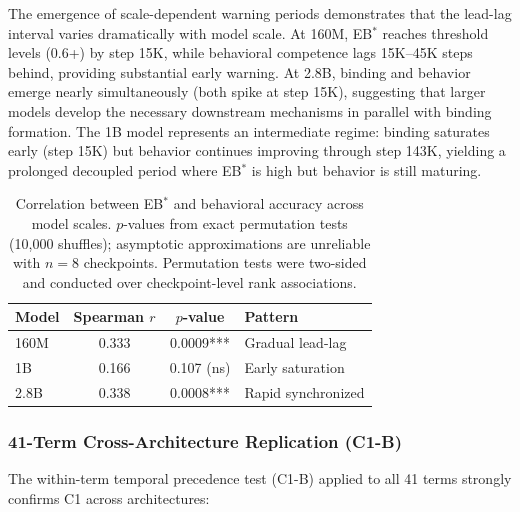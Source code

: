 \documentclass[10pt]{article} %
\begin{document}
The emergence of scale-dependent warning periods demonstrates that the lead-lag interval varies dramatically with model scale.
At 160M, EB$^*$ reaches threshold levels (0.6+) by step 15K, while behavioral competence lags 15K--45K steps behind, providing substantial early warning.
At 2.8B, binding and behavior emerge nearly simultaneously (both spike at step 15K), suggesting that larger models develop the necessary downstream mechanisms in parallel with binding formation.
The 1B model represents an intermediate regime: binding saturates early (step 15K) but behavior continues improving through step 143K, yielding a prolonged decoupled period where EB$^*$ is high but behavior is still maturing.

\begin{table}[h]
\centering
\begin{tabular}{|l|c|c|l|}
\hline
\textbf{Model} & \textbf{Spearman $r$} & \textbf{$p$-value} & \textbf{Pattern} \\
\hline
160M & 0.333 & 0.0009*** & Gradual lead-lag \\
1B & 0.166 & 0.107 (ns) & Early saturation \\
2.8B & 0.338 & 0.0008*** & Rapid synchronized \\
\hline
\end{tabular}
\caption{Correlation between EB$^*$ and behavioral accuracy across model scales. $p$-values from exact permutation tests (10{,}000 shuffles); asymptotic approximations are unreliable with $n=8$ checkpoints. Permutation tests were two-sided and conducted over checkpoint-level rank associations.}
\label{tab:ebstar_behavior_corr}
\end{table}

\subsubsection{41-Term Cross-Architecture Replication (C1-B)}

The within-term temporal precedence test (C1-B) applied to all 41 terms strongly confirms C1 across architectures:
\end{document}
